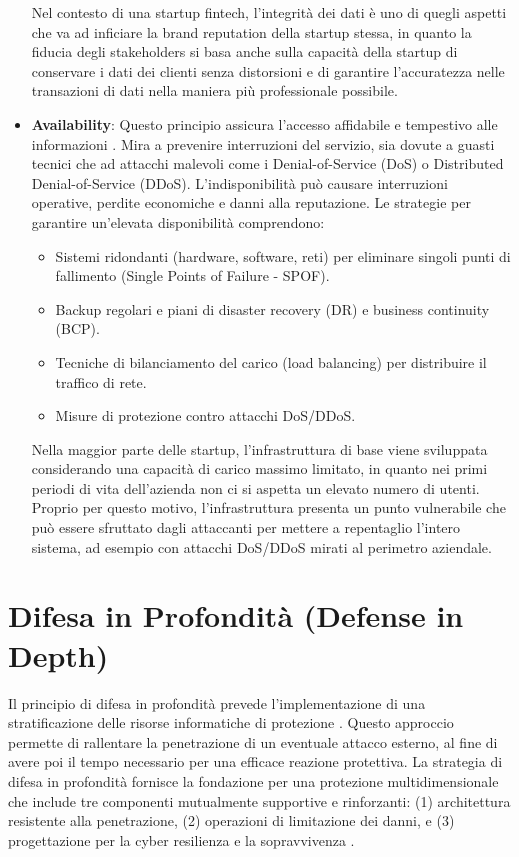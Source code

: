 \begin{itemize}
Nel contesto di una startup fintech, l'integrità dei dati è uno di quegli aspetti che va ad inficiare la brand reputation della startup stessa, in quanto la fiducia degli stakeholders si basa anche sulla capacità della startup di conservare i dati dei clienti senza distorsioni e di garantire l'accuratezza nelle transazioni di dati nella maniera più professionale possibile.

\item \textbf{Availability}: Questo principio assicura l'accesso affidabile e tempestivo alle informazioni \cite{NIST_SP_1800_26}. Mira a prevenire interruzioni del servizio, sia dovute a guasti tecnici che ad attacchi malevoli come i Denial-of-Service (DoS) o Distributed Denial-of-Service (DDoS). L'indisponibilità può causare interruzioni operative, perdite economiche e danni alla reputazione. Le strategie per garantire un'elevata disponibilità comprendono:
\begin{itemize}
    \item Sistemi ridondanti (hardware, software, reti) per eliminare singoli punti di fallimento (Single Points of Failure - SPOF).
    \item Backup regolari e piani di disaster recovery (DR) e business continuity (BCP).
    \item Tecniche di bilanciamento del carico (load balancing) per distribuire il traffico di rete.
    \item Misure di protezione contro attacchi DoS/DDoS.
\end{itemize}

Nella maggior parte delle startup, l'infrastruttura di base viene sviluppata considerando una capacità di carico massimo limitato, in quanto nei primi periodi di vita dell'azienda non ci si aspetta un elevato numero di utenti. Proprio per questo motivo, l'infrastruttura presenta un punto vulnerabile che può essere sfruttato dagli attaccanti per mettere a repentaglio l'intero sistema, ad esempio con attacchi DoS/DDoS mirati al perimetro aziendale.
\end{itemize}

\section{Difesa in Profondità (Defense in Depth)}
Il principio di difesa in profondità prevede l'implementazione di una stratificazione delle risorse informatiche di protezione \cite{Cyberment}. Questo approccio permette di rallentare la penetrazione di un eventuale attacco esterno, al fine di avere poi il tempo necessario per una efficace reazione protettiva. La strategia di difesa in profondità fornisce la fondazione per una protezione multidimensionale che include tre componenti mutualmente supportive e rinforzanti: (1) architettura resistente alla penetrazione, (2) operazioni di limitazione dei danni, e (3) progettazione per la cyber resilienza e la sopravvivenza \cite{NIST_SP_800_172}.

